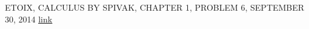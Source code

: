 \documentclass[letterpaper, 10 pt, conference]{ieeeconf}  %
\begin{document}
\begin{thebibliography}{99}

 ETOIX, CALCULUS BY SPIVAK, CHAPTER 1, PROBLEM 6, SEPTEMBER 30, 2014 \href{https://etoix.wordpress.com/2014/09/30/calculus-by-spivak-chapter-1-problem-6/}{\underline{link}}
\end{thebibliography}
\end{document}
